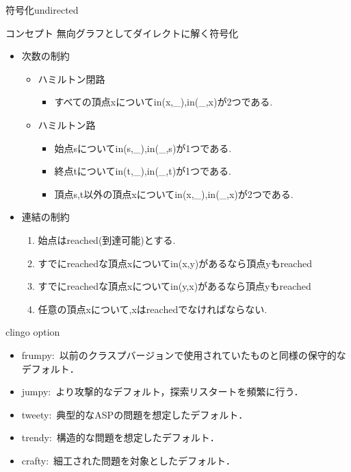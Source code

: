 \documentclass[dvipdfmx,11pt]{beamer}
\begin{document}
\begin{frame}[noframenumbering]{符号化undirected}
  \begin{alertblock}{コンセプト}
    無向グラフとしてダイレクトに解く符号化
  \end{alertblock}
  \begin{itemize}
  \item \alert{次数の制約}
    \begin{itemize}
    \item ハミルトン閉路
      \begin{itemize}
      \item すべての頂点xについてin(x,\_),in(\_,x)が2つである.
      \end{itemize}
    \item ハミルトン路
      \begin{itemize}
      \item 始点sについてin(s,\_),in(\_,s)が1つである.
      \item 終点tについてin(t,\_),in(\_,t)が1つである.
      \item 頂点s,t以外の頂点xについてin(x,\_),in(\_,x)が2つである.
      \end{itemize}
    \end{itemize}
  \item \alert{連結の制約}
    \begin{enumerate}
    \item 始点はreached(到達可能)とする.
    \item すでにreachedな頂点xについてin(x,y)があるなら頂点yもreached
    \item すでにreachedな頂点xについてin(y,x)があるなら頂点yもreached
    \item 任意の頂点xについて,xはreachedでなければならない.
    \end{enumerate}
  \end{itemize}
\end{frame}
\begin{frame}[noframenumbering]{clingo option}
   \begin{itemize}
     \item frumpy:\ 以前のクラスプバージョンで使用されていたものと同様の保守的なデフォルト．
     \item jumpy:\ より攻撃的なデフォルト，探索リスタートを頻繁に行う．
     \item tweety:\ 典型的なASPの問題を想定したデフォルト．
     \item trendy:\ 構造的な問題を想定したデフォルト．
     \item crafty:\ 細工された問題を対象としたデフォルト．
   \end{itemize}
\end{frame}
\end{document}

